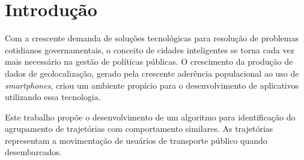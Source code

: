 \chapter[Introdução]{Introdução}

Com a crescente demanda de soluções tecnológicas para resolução de problemas cotidianos governamentais, o conceito de cidades inteligentes se torna cada vez mais necessário na gestão de políticas públicas. O crescimento da produção de dados de geolocalização, gerado pela crescente aderência populacional ao uso de \textit{smartphones}, criou um ambiente propício para o desenvolvimento de aplicativos utilizando essa tecnologia.

Este trabalho propõe o desenvolvimento de um algoritmo para identificação do agrupamento de trajetórias com comportamento similares. As trajetórias representam a movimentação de usuários de transporte público quando desembarcados.